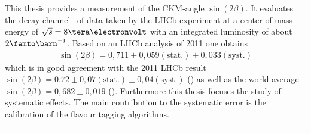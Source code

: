\section*{\abstractname}
This thesis provides a measurement of the CKM-angle $\sin(2\beta)$. It evaluates the decay channel \Decaychannel\ of data taken by the LHCb experiment at a center of mass energy of $\sqrt{s}=8\tera\electronvolt$ with an integrated luminosity of about $2\femto\barn^{-1}$. Based on an LHCb analysis of 2011 one obtains
\begin{align*}
\sin(2\beta) = 0,711 \pm 0,059(\text{stat.}) \pm 0,033(\text{syst.})
\end{align*}
which is in good agreement with the 2011 LHCb result $\sin(2\beta) = 0.72 \pm 0,07 (\text{stat.}) \pm 0,04 (\text{syst.})$ (\cite{lhcb-paper}) as well as the world average $\sin(2\beta) = 0,682 \pm 0,019$ (\cite{pdg-average}). Furthermore this thesis focuses the study of systematic effects. The main contribution to the systematic error is the calibration of the flavour tagging algorithms. \\ \hrule





